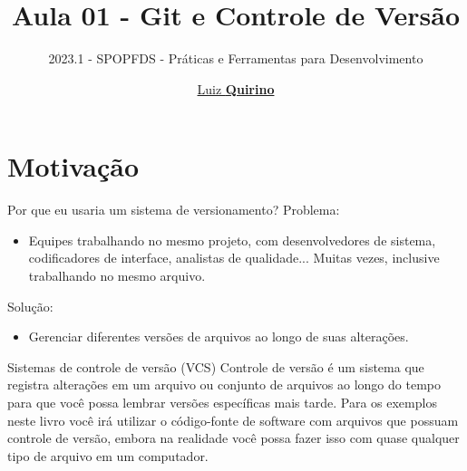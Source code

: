 \documentclass{beamer}
\title{Aula 01 - Git e Controle de Versão}
\subtitle{2023.1 - SPOPFDS - Práticas e Ferramentas para Desenvolvimento }
\author{\href{mailto:luizfpq@gmail.com}{Luiz \textbf{Quirino}}}
\newcommand{\hrefcol}[2]{\textcolor{cyan}{\href{#1}{#2}}}
\begin{document}
\maketitle

%
%




\section{Motivação}

\begin{frame}{Por que eu usaria um sistema de versionamento?}
Problema:
\begin{itemize}
      \item Equipes trabalhando no mesmo projeto, com desenvolvedores de sistema, codificadores de interface, analistas de qualidade... Muitas vezes, inclusive trabalhando no mesmo arquivo.
\end{itemize}
Solução:
\begin{itemize}
      \item Gerenciar diferentes versões de arquivos ao longo de suas alterações.
\end{itemize}
\end{frame}

\begin{frame}{Sistemas de controle de versão (VCS)}\justifying
      Controle de versão é um sistema que registra alterações em um arquivo ou conjunto de arquivos ao longo do tempo para que você possa lembrar versões específicas mais tarde. Para os exemplos neste livro você irá utilizar o código-fonte de software com arquivos que possuam controle de versão, embora na realidade você possa fazer isso com quase qualquer tipo de arquivo em um computador.
\end{frame}
\end{document}
